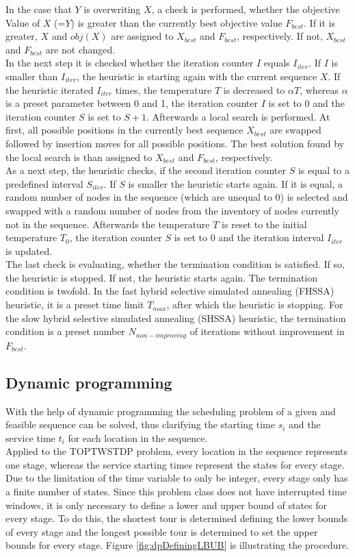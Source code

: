 \documentclass[final,5p,times,twocolumn]{elsarticle}
\begin{document}
{{In the case that $Y$ is overwriting $X$, a check is performed, whether the objective Value of $X$ (=$Y$) is greater than the currently best objective value $F_{best}$. If it is greater, $X$ and $obj(X)$ are assigned to $X_{best}$ and $F_{best}$, respectively. If not, $X_{best}$ and $F_{best}$ are not changed. \\
In the next step it is checked whether the iteration counter $I$ equals $I_{iter}$. If $I$ is smaller than $I_{iter}$, the heuristic is starting again with the current sequence $X$. If the heuristic iterated $I_{iter}$ times, the temperature $T$ is decreased to $\alpha T$, whereas $\alpha$ is a preset parameter between 0 and 1, the iteration counter $I$ is set to 0 and the iteration counter $S$ is set to $S+1$. Afterwards a local search is performed. At first, all possible positions in the currently best sequence $X_{best}$ are swapped followed by insertion moves for all possible positions. The best solution found by the local search is than assigned to $X_{best}$ and $F_{best}$, respectively.\\ 
As a next step, the heuristic checks, if the second iteration counter $S$ is equal to a predefined interval $S_{iter}$. If $S$ is smaller the heuristic starts again. If it is equal,  a random number of nodes in the sequence (which are unequal to 0) is selected and swapped with a random number of nodes from the inventory of nodes currently not in the sequence. Afterwards the temperature $T$ is reset to the initial temperature $T_{0}$, the iteration counter $S$ is set to 0 and the iteration interval $I_{iter}$ is updated. \\
The last check is evaluating, whether the termination condition is satisfied. If so, the heuristic is stopped. If not, the heuristic starts again. The termination condition is twofold. In the fast hybrid selective simulated annealing (FHSSA) heuristic, it is a preset time limit $T_{max}$, after which the heuristic is stopping. For the slow hybrid selective simulated annealing (SHSSA) heuristic, the termination condition is a preset number $N_{non-improving}$ of iterations without improvement in $F_{best}$.
     
\subsection{Dynamic programming}
With the help of dynamic programming the scheduling problem of a given and feasible sequence can be solved, thus clarifying the starting time $s_{i}$ and the service time $t_{i}$ for each location in the sequence. \\
Applied to the TOPTWSTDP problem, every location in the sequence represents one stage, whereas the service starting times represent the states for every stage. Due to the limitation of the time variable to only be integer, every stage only has a finite number of states. Since this problem class does not have interrupted time windows, it is only necessary to define a lower and upper bound of states for every stage. To do this, the shortest tour is determined defining the lower bounds of every stage and the longest possible tour is determined to set the upper bounds for every stage. Figure \ref{fig:dpDefiningLBUB} is illustrating the procedure.

}}
\end{document}
